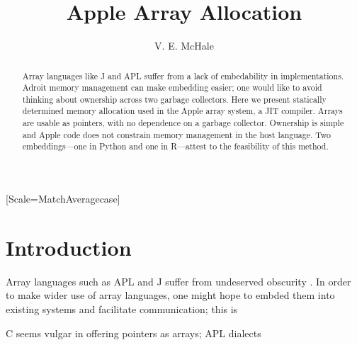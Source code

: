 \documentclass[sigplan,screen]{acmart}
\begin{document}
\setmonofont{Jet Brains Mono}[Scale=MatchAveragecase]



\begin{abstract}
    Array languages like J and APL suffer from a lack of embedability in implementations. Adroit memory management can make embedding easier; one would like to avoid thinking about ownership across two garbage collectors.
    Here we present statically determined memory allocation used in the Apple array system, a JIT compiler. Arrays are usable as pointers, with no dependence on a garbage collector.
    Ownership is simple and Apple code does not constrain memory management in the host language.
    Two embeddings---one in Python and one in R---attest to the feasibility of this method.
\end{abstract}

\title{Apple Array Allocation}
\author{V. E. McHale}
\maketitle

\section{Introduction}

Array languages such as APL and J suffer from undeserved obscurity \cite{hsu2023}. In order to make wider use of array languages, one might hope to embded them into existing systems and facilitate communication; this is \cite{kell2017}

C seems vulgar in offering pointers as arrays; APL dialects



\end{document}
